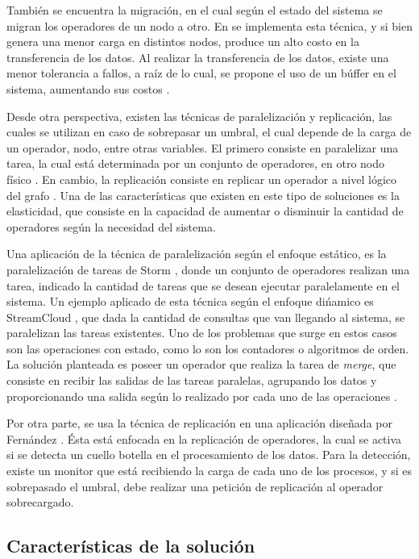 \documentclass[12pt,letterpaper]{article}
\begin{document}
También se encuentra la migración, en el cual según el estado del sistema se migran los operadores de un nodo a otro. En \cite{XingZH05} se implementa   esta técnica, y si bien genera una menor carga en distintos nodos, produce un alto costo en la transferencia de los datos. Al realizar la transferencia de los datos, existe una menor tolerancia a fallos, a raíz de lo cual, se propone el uso de un búffer en el sistema, aumentando sus costos \cite{PittauACA07}.

Desde otra perspectiva, existen las técnicas de paralelización y replicación, las cuales se utilizan en caso de sobrepasar un umbral, el cual depende de la carga de un operador, nodo, entre otras variables. El primero consiste en paralelizar una tarea, la cual está determinada por un conjunto de operadores, en otro nodo físico \cite{IshiiS11}. En cambio, la replicación consiste en replicar un operador a nivel lógico del grafo \cite{MadsenTZ14}. Una de las características que existen en este tipo de soluciones es la elasticidad, que consiste en la capacidad de aumentar o disminuir la cantidad de operadores según la necesidad del sistema.

Una aplicación de la técnica de paralelización según el enfoque estático, es la paralelización de tareas de Storm \cite{stormtwitterdoc}, donde un conjunto de operadores realizan una tarea, indicado la cantidad de tareas que se desean ejecutar paralelamente en el sistema. Un ejemplo aplicado de esta técnica según el enfoque dińamico es StreamCloud \cite{GulisanoJPSV12}, que dada la cantidad de consultas que van llegando al sistema, se paralelizan las tareas existentes. Uno de los problemas que surge en estos casos son las operaciones con estado, como lo son los contadores o algoritmos de orden. La solución planteada es poseer un operador que realiza la tarea de \textsl{merge}, que consiste en recibir las salidas de las tareas paralelas, agrupando los datos y proporcionando una salida según lo realizado por cada uno de las operaciones \cite{GedikSHW14}.

Por otra parte, se usa la técnica de replicación en una aplicación diseñada por Fernández \cite{FernandezMKP13}. Ésta está enfocada en la replicación de operadores, la cual se activa si se detecta un cuello botella en el procesamiento de los datos. Para la detección, existe un monitor que está recibiendo la carga de cada uno de los procesos, y si es sobrepasado el umbral, debe realizar una petición de replicación al operador sobrecargado.

\subsection{Características de la solución}
\end{document}
